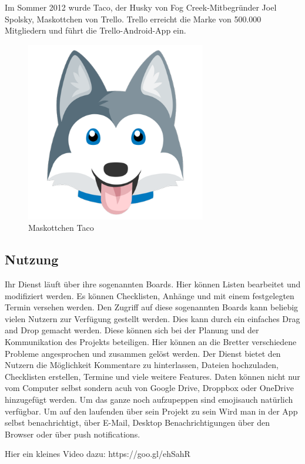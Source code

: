 Im Sommer 2012 wurde Taco, der Husky von Fog Creek-Mitbegründer Joel Spolsky, Maskottchen von Trello. Trello erreicht die Marke von 500.000 Mitgliedern und führt die Trello-Android-App ein.
\begin{figure}[h]
  \centering
    \includegraphics[width=0.7\textwidth]{taco.png}
  \caption{Maskottchen Taco}
  \label{fig:taco}
\end{figure}
\subsection{Nutzung}
Ihr Dienst läuft über ihre sogenannten Boards. Hier können Listen bearbeitet und modifiziert werden. Es können Checklisten, Anhänge und mit einem festgelegten Termin versehen werden. Den Zugriff auf diese sogenannten Boards kann beliebig vielen Nutzern zur Verfügung gestellt werden. Dies kann durch ein einfaches Drag and Drop gemacht werden. Diese können sich bei der Planung und der Kommunikation des Projekts beteiligen. Hier können an die Bretter verschiedene Probleme angesprochen und zusammen gelöst werden. Der Dienst bietet den Nutzern die Möglichkeit Kommentare zu hinterlassen, Dateien hochzuladen, Checklisten erstellen, Termine und viele weitere Features.
Daten können nicht nur vom Computer selbst sondern acuh von Google Drive, Droppbox oder OneDrive hinzugefügt werden. Um das ganze noch aufzupeppen sind \glqq emojis\grqq \space auch natürlich verfügbar. Um auf den laufenden über sein Projekt zu sein Wird man in der App selbst benachrichtigt, über E-Mail, Desktop Benachrichtigungen über den Browser oder über \glqq push notifications\grqq.

Hier ein kleines Video dazu: https://goo.gl/ehSahR

